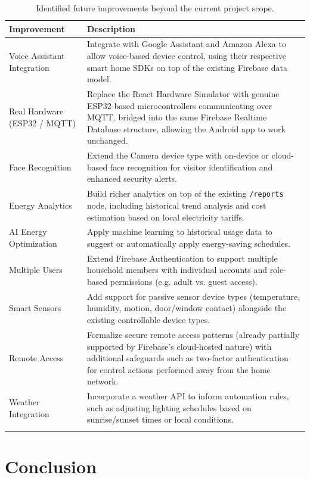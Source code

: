 \documentclass[11pt,a4paper]{article}
\begin{document}
\begin{longtable}{@{}p{3.6cm}p{9.6cm}@{}}
\toprule
\textbf{Improvement} & \textbf{Description} \\
\midrule
\endhead
Voice Assistant Integration & Integrate with Google Assistant and Amazon Alexa to allow voice-based device control, using their respective smart home SDKs on top of the existing Firebase data model. \\
Real Hardware (ESP32 / MQTT) & Replace the React Hardware Simulator with genuine ESP32-based microcontrollers communicating over MQTT, bridged into the same Firebase Realtime Database structure, allowing the Android app to work unchanged. \\
Face Recognition & Extend the Camera device type with on-device or cloud-based face recognition for visitor identification and enhanced security alerts. \\
Energy Analytics & Build richer analytics on top of the existing \texttt{/reports} node, including historical trend analysis and cost estimation based on local electricity tariffs. \\
AI Energy Optimization & Apply machine learning to historical usage data to suggest or automatically apply energy-saving schedules. \\
Multiple Users & Extend Firebase Authentication to support multiple household members with individual accounts and role-based permissions (e.g. adult vs. guest access). \\
Smart Sensors & Add support for passive sensor device types (temperature, humidity, motion, door/window contact) alongside the existing controllable device types. \\
Remote Access & Formalize secure remote access patterns (already partially supported by Firebase's cloud-hosted nature) with additional safeguards such as two-factor authentication for control actions performed away from the home network. \\
Weather Integration & Incorporate a weather API to inform automation rules, such as adjusting lighting schedules based on sunrise/sunset times or local conditions. \\
\bottomrule
\caption{Identified future improvements beyond the current project scope.}
\label{tab:future-improvements}
\end{longtable}

\section{Conclusion}
\label{sec:conclusion}
\end{document}
